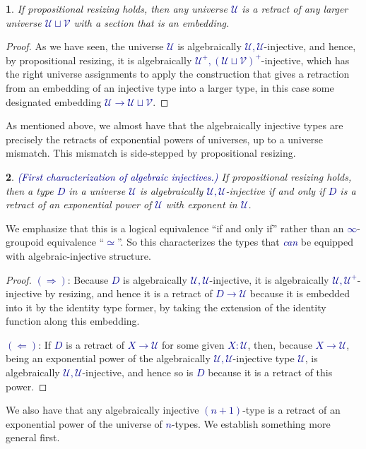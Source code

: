 \documentclass[10pt]{article}
\newcommand{\db}{\textcolor{darkblue}}
\newcommand{\df}[1]{\emph{\db{#1}}}
\newcommand{\m}[1]{\db{$#1$}}
\newcommand{\U}{\mathcal{U}}
\newcommand{\V}{\mathcal{V}}
\newtheorem{numbered}{}
\theoremstyle{definition}
\begin{document}
\begin{numbered}
  If propositional resizing holds, then any universe \m{\U} is a
  retract of any larger universe \m{\U \sqcup \V} with a section that
  is an embedding.
\end{numbered}
\begin{proof}
  As we have seen, the universe \m{\U} is algebraically
  \m{\U,\U}-injective, and hence, by propositional resizing, it is
  algebraically \m{\U^+,(\U \sqcup \V)^+}-injective, which has the
  right universe assignments to apply the construction that gives a
  retraction from an embedding of an injective type into a larger
  type, in this case some designated embedding \m{\U \to \U \sqcup
    \V}.
\end{proof}

As mentioned above, we almost have that the algebraically injective
types are precisely the retracts of exponential powers of universes,
up to a universe mismatch. This mismatch is side-stepped by
propositional resizing.

\begin{numbered} \df{(First characterization of algebraic
    injectives.)}  If propositional resizing holds, then a type \m{D}
  in a universe \m{\U} is algebraically \m{\U,\U}-injective if and
  only if \m{D} is a retract of an exponential power of \m{\U} with
  exponent in \m{\U}.
\end{numbered}
\noindent We emphasize that this is a logical equivalence ``if and
only if'' rather than an \m{\infty}-groupoid equivalence
``\m{\simeq}''.  So this characterizes the types
  that \df{can} be equipped with algebraic-injective structure.
\begin{proof}
  \m{(\Rightarrow)}: Because \m{D} is algebraically
  \m{\U,\U}-injective, it is algebraically \m{\U,\U^+}-injective by
  resizing, and hence it is a retract of \m{D \to \U} because it is
  embedded into it by the identity type former, by taking the
  extension of the identity function along this embedding.

  \m{(\Leftarrow)}: If \m{D} is a retract of \m{X \to \U} for some
  given \m{X:\U}, then, because \m{X \to \U}, being an exponential
  power of the algebraically \m{\U ,\U}-injective type \m{\U}, is
  algebraically \m{\U,\U}-injective, and hence so is \m{D} because it
  is a retract of this power.
\end{proof}

We also have that any algebraically injective \m{(n+1)}-type is a retract
of an exponential power of the universe of \m{n}-types. We establish something
more general first.
\end{document}
